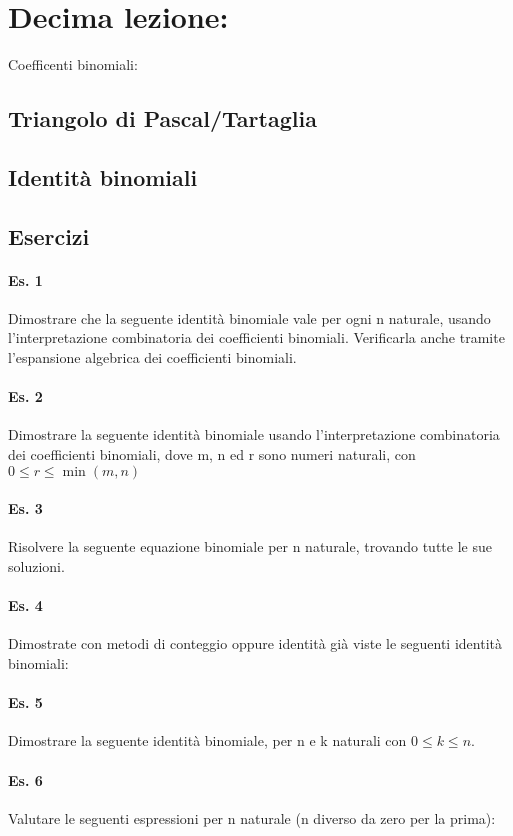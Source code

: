 \section{Decima lezione:}
Coefficenti binomiali:

\subsection{Triangolo di Pascal/Tartaglia}

\subsection{Identità binomiali} 

\subsection{Esercizi}

\paragraph{Es. 1} Dimostrare che la seguente identità binomiale vale per ogni n naturale,
usando l'interpretazione combinatoria dei coefficienti binomiali.
Verificarla anche tramite l'espansione algebrica dei coefficienti binomiali.

\paragraph{Es. 2} Dimostrare la seguente identità binomiale usando l'interpretazione combinatoria dei
coefficienti binomiali, dove m, n ed r sono numeri naturali, con \(0 \leq r \leq \min (m,n)\)

\paragraph{Es. 3} %
Risolvere la seguente equazione binomiale per n naturale, trovando tutte le sue soluzioni.

\paragraph{Es. 4} Dimostrate con metodi di conteggio oppure identità già viste le seguenti identità binomiali:

\paragraph{Es. 5} %
Dimostrare la seguente identità binomiale, per n e k naturali con $0 \leq k \leq n$.

\paragraph{Es. 6}%
Valutare le seguenti espressioni per n naturale (n diverso da zero per la prima):


\newpage
